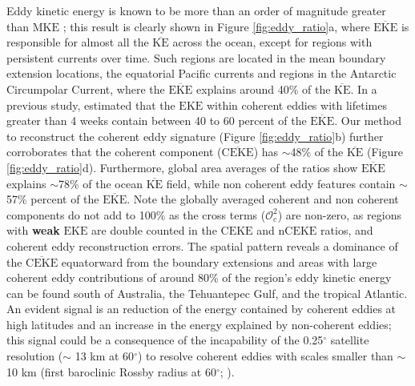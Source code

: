 \documentclass[draft,linenumbers]{agujournal2019}
\newcommand{\MKE}{\overline{\textrm{KE}}}
\newcommand{\mKE}{\textrm{MKE}}
\newcommand{\MEKE}{\overline{\textrm{EKE}}}
\newcommand{\EKE}{\textrm{EKE}}
\newcommand{\MCEKE}{\overline{\textrm{CEKE}}}
\newcommand{\CEKE}{\textrm{CEKE}}
\newcommand{\nCEKE}{\textrm{nCEKE}}
\begin{document}
	Eddy kinetic energy is known to be more than an order of magnitude greater than $\mKE$ \citep{Gill_Energy_1974}; this result is clearly shown in Figure \ref{fig:eddy_ratio}a, where $\MEKE$ is responsible for almost all the $\MKE$ across the ocean, except for regions with persistent currents over time. 
	Such regions are located in the mean boundary extension locations, the equatorial Pacific currents and regions in the Antarctic Circumpolar Current, where the $\MEKE$ explains around 40\% of the $\MKE$. 
	In a previous study, \citet{Chelton_The_2011} estimated that the $\EKE$ within coherent eddies with lifetimes greater than 4 weeks contain between 40 to 60 percent of the $\MEKE$. 
	Our method to reconstruct the coherent eddy signature (Figure \ref{fig:eddy_ratio}b) further corroborates that the coherent component ($\MCEKE$) has $\sim$48\% of the $\MKE$ (Figure \ref{fig:eddy_ratio}d). 
	Furthermore, global area averages of the ratios show $\MEKE$ explains $\sim$78\% of the ocean $\MKE$ field, while non coherent eddy features contain $\sim$57\% percent of the $\MEKE$. 
	Note the globally averaged coherent and non coherent components do not add to 100\% as the cross terms ($\mathcal{O}_c^2$) are non-zero, as regions with \textbf{weak} $\EKE$ are double counted in the $\CEKE$ and $\nCEKE$ ratios, and coherent eddy reconstruction errors.
	The spatial pattern reveals a dominance of the $\MCEKE$ equatorward from the boundary extensions and areas with large coherent eddy contributions of around 80\% of the region's eddy kinetic energy can be found south of Australia, the Tehuantepec Gulf, and the tropical Atlantic. 
	An evident signal is an reduction of the energy contained by coherent eddies at high latitudes and an increase in the energy explained by non-coherent eddies; this signal could be a consequence of the incapability of the 0.25$^\circ$ satellite resolution ($\sim$ 13 km at 60$^\circ$) to resolve coherent eddies with scales smaller than $\sim$10 km (first baroclinic Rossby radius at 60$^\circ$; \citealt{Chelton_Geographical_1998}).


\end{document}
